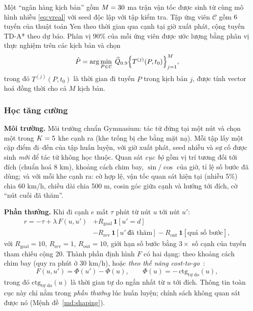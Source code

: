 Một ``ngân hàng kịch bản'' gồm $M=30$ ma trận vận tốc được sinh từ cùng mô hình nhiễu \eqref{eq:vreal} với seed độc
lập với tập kiểm tra. Tập ứng viên $\mathcal{C}$ gồm $6$ tuyến của thuật toán Yen theo thời gian qua cạnh tại giờ xuất
phát, cộng tuyến TD-A* theo dự báo. Phân vị 90\% của mỗi ứng viên được ước lượng bằng phân vị thực nghiệm trên các kịch bản
và chọn
\begin{equation}
\hat{P} = \arg\min_{P\in\mathcal{C}}\; \widehat{Q}_{0.9}\Bigl\{T^{(j)}(P,t_0)\Bigr\}_{j=1}^{M},
\label{eq:risk-est}
\end{equation}
trong đó $T^{(j)}(P,t_0)$ là thời gian đi tuyến $P$ trong kịch bản $j$, được tính vector hoá đồng thời cho cả $M$ kịch bản.

\subsubsection{Học tăng cường}\label{sec:method:rl}

\textbf{Môi trường.} Môi trường chuẩn Gymnasium: tác tử đứng tại một nút và chọn một trong $K=5$ khe cạnh ra
(khe trống bị che bằng mặt nạ). Mỗi tập lấy một cặp điểm đi--đến của tập huấn luyện, với giờ xuất phát, seed nhiễu và sự
cố được sinh \emph{mới} để tác tử không học thuộc. Quan sát \emph{cục bộ} gồm vị trí tương đối tới đích (chuẩn hoá 8 km),
khoảng cách chim bay, $\sin/\cos$ của giờ, tỉ lệ số bước đã dùng; và với mỗi khe cạnh ra: cờ hợp lệ, vận tốc quan sát
hiện tại (nhiễu 5\%) chia 60 km/h, chiều dài chia 500 m, cosin góc giữa cạnh và hướng tới đích, cờ ``nút cuối đã thăm''.

\textbf{Phần thưởng.} Khi đi cạnh $e$ mất $\tau$ phút từ nút $u$ tới nút $u'$:
\begin{equation}
\begin{aligned}
r = -\tau + \lambda\,F(u,u') &+ R_{\text{goal}}\,\mathbf{1}[u'=d] \\
&- R_{\text{rev}}\,\mathbf{1}[u'\ \text{đã thăm}] - R_{\text{out}}\,\mathbf{1}[\text{quá số bước}],
\end{aligned}
\label{eq:reward}
\end{equation}
với $R_{\text{goal}}=10$, $R_{\text{rev}}=1$, $R_{\text{out}}=10$, giới hạn số bước bằng $3\times$ số cạnh của tuyến tham chiếu
cộng 20. Thành phần định hình $F$ có hai dạng: theo khoảng cách chim bay (quy ra phút ở 30 km/h), hoặc \emph{theo thế
năng cost-to-go}~\cite{ng1999}:
\begin{equation}
F(u,u') = \Phi(u') - \Phi(u), \qquad \Phi(u) = -\,\text{ctg}_{\text{tự do}}(u),
\label{eq:shaping}
\end{equation}
trong đó $\text{ctg}_{\text{tự do}}(u)$ là thời gian tự do ngắn nhất từ $u$ tới đích. Thông tin toàn cục này chỉ nằm trong
\emph{phần thưởng} lúc huấn luyện; chính sách không quan sát được nó (Mệnh đề~\ref{md:shaping}).

